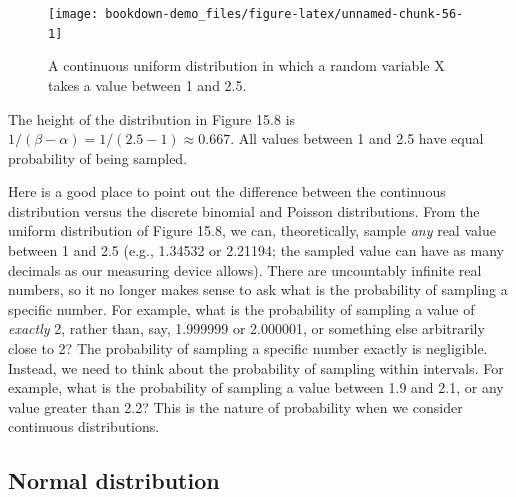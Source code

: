 \documentclass[
  openany]{krantz}
\begin{document}
\begin{figure}
\texttt{[image: bookdown-demo\_files/figure-latex/unnamed-chunk-56-1]} \caption{A continuous uniform distribution in which a random variable X takes a value between 1 and 2.5.}\label{fig:unnamed-chunk-56}
\end{figure}

The height of the distribution in Figure 15.8 is \(1/(\beta - \alpha) = 1/(2.5 - 1) \approx 0.667\).
All values between 1 and 2.5 have equal probability of being sampled.

Here is a good place to point out the difference between the continuous distribution versus the discrete binomial and Poisson distributions.
From the uniform distribution of Figure 15.8, we can, theoretically, sample \emph{any} real value between 1 and 2.5 (e.g., 1.34532 or 2.21194; the sampled value can have as many decimals as our measuring device allows).
There are uncountably infinite real numbers, so it no longer makes sense to ask what is the probability of sampling a specific number.
For example, what is the probability of sampling a value of \emph{exactly} 2, rather than, say, 1.999999 or 2.000001, or something else arbitrarily close to 2?
The probability of sampling a specific number exactly is negligible.
Instead, we need to think about the probability of sampling within intervals.
For example, what is the probability of sampling a value between 1.9 and 2.1, or any value greater than 2.2?
This is the nature of probability when we consider continuous distributions.

\hypertarget{normal-distribution}{%
\subsection{Normal distribution}\label{normal-distribution}}
\end{document}
